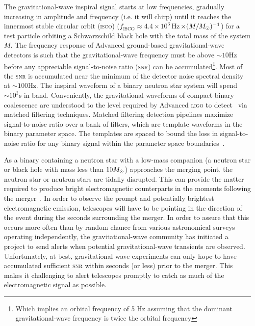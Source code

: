 The gravitational-wave inspiral signal starts at low frequencies, gradually
increasing in amplitude and frequency (i.e. it will chirp) until it reaches the
innermost stable circular orbit (\textsc{isco}) ($f_\mathrm{ISCO} \approx
4.4\times 10^3\,$Hz$\,\times(M/M_{\odot})^{-1}$)  for a test particle orbiting a
Schwarzschild black hole with the total mass of the system $M$.  The frequency
response of Advanced ground-based gravitational-wave detectors is such that the
gravitational-wave frequency must be above $\sim 10$Hz before any appreciable
signal-to-noise ratio (\textsc{snr}) can be accumulated\footnote{Which implies
an orbital frequency of 5 Hz assuming that the dominant gravitational-wave
frequency is twice the orbital frequency}.  Most of the \textsc{snr} is
accumulated near the minimum of the detector noise spectral density at $\sim
100$Hz. The inspiral waveform of a binary neutron star system will spend $\sim
10^3$s in band.  Conveniently, the gravitational waveforms of compact binary
coalescence are understood to the level required by Advanced \textsc{ligo} to
detect~\cite{BuonannoIyerOchsnerYiSathya2009} via matched filtering techniques.
Matched filtering detection pipelines maximize signal-to-noise ratio over a
bank of filters, which are template waveforms in the binary parameter space.
The templates are spaced to bound the loss in signal-to-noise ratio for any
binary signal within the parameter space
boundaries~\cite{Owen:1995tm,Owen:1998dk}.

As a binary containing a neutron star with a low-mass companion (a neutron star
or black hole with mass less than $10M_{\odot}$) approaches the merging point, the
neutron star or neutron stars are tidally disrupted. This can provide
the matter required to produce bright electromagnetic counterparts in the
moments following the merger~\cite{shibata:2007}.
In order to observe the prompt and potentially brightest
electromagnetic emission, telescopes will have to be pointing in the direction
of the event during the seconds surrounding the merger. In order to assure
that this occurs more often than by random chance from various astronomical
surveys operating independently, the gravitational-wave community has initiated
a project to send alerts when potential gravitational-wave transients are
observed. Unfortunately, at best, gravitational-wave experiments can only hope
to have accumulated sufficient \textsc{snr} within seconds (or less) prior to
the merger.  This makes it challenging to alert telescopes promptly to catch as
much of the electromagnetic signal as possible.

